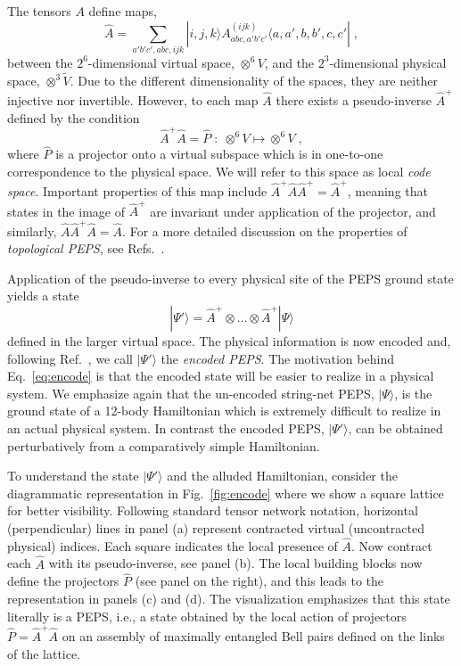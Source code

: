 \documentclass[twocolumn,floats,prx,showpacs]{revtex4-1}
\newcommand{\ket}[1]{|#1\rangle}
\newcommand{\bra}[1]{\langle#1|}
\begin{document}
The tensors $A$ define maps, 
\begin{equation}
\hat A = \sum_{a'b'c',abc,ijk} \ket{i,j,k} A^{(ijk)}_{abc,a'b'c'} \bra{a,a',b,b',c,c'}\;,
\end{equation}
between the $2^6$-dimensional virtual space, $\otimes^6 V$, and the $2^3$-dimensional physical space, $\otimes^3 \tilde V$. Due to the different dimensionality of the spaces,  they are neither injective nor invertible. However, to each map $\hat A$ there exists a pseudo-inverse $\hat A^+$ defined by the condition 
\begin{equation}
\hat A^+ \hat A = \hat P \; : \; \otimes^6 V\mapsto \otimes^6 V \;, \label{eq:AAP}
\end{equation}
where $\hat P$ is a projector onto a virtual subspace which is in one-to-one correspondence to the physical space. We will refer to this space as local \emph{code space}. Important properties of this map include $\hat A^+ \hat A \hat A^+ =\hat A^+$, meaning that states in the image of $\hat A^+$ are invariant under application of the projector, and similarly, $\hat A\hat A^+ \hat A=\hat A$. For a more detailed discussion on the properties of \emph{topological PEPS}, see Refs.\ \cite{Schuch-AnnPhys-2010,Buerschaper-AnnPhys-2014,1409.2150,Bultinck2017}.

Application of the pseudo-inverse to every physical site of the PEPS ground state yields a state 
\begin{equation}
\ket{\Psi'}=\hat A^+ \otimes \ldots \otimes \hat A^+ \ket{\Psi} \label{eq:encode}
\end{equation}
defined in the larger virtual space. The physical information is now encoded and, following Ref.~\cite{Brell2014PEPS}, we call $\ket{\Psi'}$ the \emph{encoded PEPS}.
The motivation behind Eq.~\eqref{eq:encode}  is that the encoded state will be easier to realize in a physical system. We emphasize again that the un-encoded string-net PEPS, $\ket{\Psi}$, is the ground state of a 12-body Hamiltonian which is extremely difficult to realize in an actual physical system. In contrast the encoded PEPS, $\ket{\Psi'}$, can be obtained perturbatively from a comparatively simple Hamiltonian. 


To understand the state $\ket{\Psi'}$ and the alluded Hamiltonian, consider the diagrammatic representation in Fig.~\ref{fig:encode} where we show a square lattice for better visibility. Following standard tensor network notation, horizontal (perpendicular) lines in panel (a) represent contracted virtual (uncontracted physical) indices. Each square indicates the local presence of $\hat A$. Now contract each $\hat A$ with its 
pseudo-inverse, see panel (b). The local building blocks now define 
the projectors $\hat P$ (see panel on the right), and this leads to the representation in  panels (c) and (d). The visualization emphasizes that this state literally is a PEPS, i.e., a state obtained by the local action of projectors $\hat P=\hat A^+ \hat A$ on an assembly of maximally entangled Bell pairs defined on the links of the lattice. 
\end{document}
